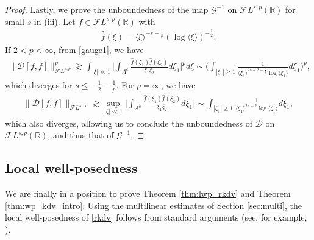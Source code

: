 \documentclass[a4paper,
11pt,  reqno]{amsart}
\newcommand{\jap}[1]{\langle #1 \rangle}
\newcommand{\5}{\textup{V}}
\newcommand{\FL}{\mathcal{F} L}
\newcommand{\ft}{\widehat}
\theoremstyle{remark}
\newcommand{\R}{\mathbb{R}}
\newcommand{\ges}{\gtrsim}
\newcommand{\jb}[1]
{\langle #1 \rangle}
\newcommand{\Gc}{\mathcal{G}}
\numberwithin{equation}{section}
\numberwithin{theorem}{section}
\newcommand{\DD}{\mathcal{D}}
\begin{document}
\begin{proof}
\smallskip 

Lastly, we prove the unboundedness of the map $\Gc^{-1}$ on $\FL^{s,p}(\R)$ for small $s$ in (iii). Let $f \in \FL^{s, p}(\R)$ with 
\begin{align}
    \ft{f}(\xi) = \jb{\xi}^{-s-\frac1p}(\log \jap{\xi})^{-\frac12}. 
\end{align}
If $2 <p <\infty$, from \eqref{gauge1}, we have
\begin{align}
\| \DD[f,f] \|_{\FL^{s,p}}^p 
\ges 
\int_{|\xi|\ll 1} \bigg| \int_{A^c} \frac{\ft{f}(\xi_1) \ft{f}(\xi_2) }{\xi_1\xi_2} d\xi_1 \bigg|^p d\xi
\sim \bigg( \int_{|\xi_1| \ge 1} \frac{1}{\jb{\xi_1}^{2s+2 + \frac2p  }\log\jap{\xi_1}} d\xi_1\bigg)^p , 
\end{align}
which diverges for $s\le-\frac12 - \frac1p$. 
For $p=\infty$, we have
\begin{align}
\| \DD[f,f]\|_{\FL^{s,\infty }}
\ges 
\sup_{|\xi| \ll 1} 
\bigg| \int_{A^c} \frac{\ft{f}(\xi_1) \ft{f}(\xi_2) }{\xi_1\xi_2} d\xi_1 \bigg|
\sim 
\int_{|\xi_1| \ge 1 } \frac{1}{\jb{\xi_1}^{2s+2}\log\jap{\xi_1}} d\xi_1  ,
\end{align}
which also diverges, allowing us to conclude the unboundedness of $\DD$ on $\FL^{s, p}(\R)$, and thus that of $\Gc^{-1}$. 
\qedhere 

\end{proof}

\subsection{Local well-posedness}
\label{SUBSEC:lwp}




We are finally in a position to prove Theorem \ref{thm:lwp_rkdv} and Theorem \ref{thm:wp_kdv_intro}.
Using the multilinear estimates of Section \ref{sec:multi}, the local well-posedness of \eqref{rkdv} follows from standard arguments (see, for example, \cite{Grunrock_mkdv, HerrGrunrock_FL}). 
\end{document}
